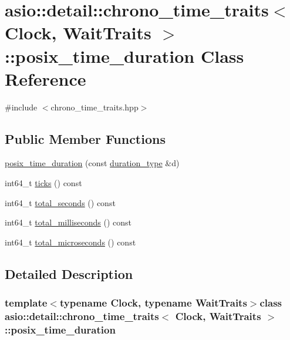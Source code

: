 \hypertarget{classasio_1_1detail_1_1chrono__time__traits_1_1posix__time__duration}{}\section{asio\+:\+:detail\+:\+:chrono\+\_\+time\+\_\+traits$<$ Clock, Wait\+Traits $>$\+:\+:posix\+\_\+time\+\_\+duration Class Reference}
\label{classasio_1_1detail_1_1chrono__time__traits_1_1posix__time__duration}


{\ttfamily \#include $<$chrono\+\_\+time\+\_\+traits.\+hpp$>$}

\subsection*{Public Member Functions}
\begin{DoxyCompactItemize}
\item 
\hyperlink{classasio_1_1detail_1_1chrono__time__traits_1_1posix__time__duration_a87bbe340a24639ed5cefd2c47766bac2}{posix\+\_\+time\+\_\+duration} (const \hyperlink{structasio_1_1detail_1_1chrono__time__traits_a7f122a7cb603e7516bb6595016960775}{duration\+\_\+type} \&d)
\item 
int64\+\_\+t \hyperlink{classasio_1_1detail_1_1chrono__time__traits_1_1posix__time__duration_a6825817d67e57a579a4e468b5251822c}{ticks} () const 
\item 
int64\+\_\+t \hyperlink{classasio_1_1detail_1_1chrono__time__traits_1_1posix__time__duration_a04cfcff494f7f1dda157926ac6f7449d}{total\+\_\+seconds} () const 
\item 
int64\+\_\+t \hyperlink{classasio_1_1detail_1_1chrono__time__traits_1_1posix__time__duration_a2e09f7fedd8968ef2c2320cac8500517}{total\+\_\+milliseconds} () const 
\item 
int64\+\_\+t \hyperlink{classasio_1_1detail_1_1chrono__time__traits_1_1posix__time__duration_aeabc313b8ed051b67aec1ff8194586c5}{total\+\_\+microseconds} () const 
\end{DoxyCompactItemize}


\subsection{Detailed Description}
\subsubsection*{template$<$typename Clock, typename Wait\+Traits$>$class asio\+::detail\+::chrono\+\_\+time\+\_\+traits$<$ Clock, Wait\+Traits $>$\+::posix\+\_\+time\+\_\+duration}




